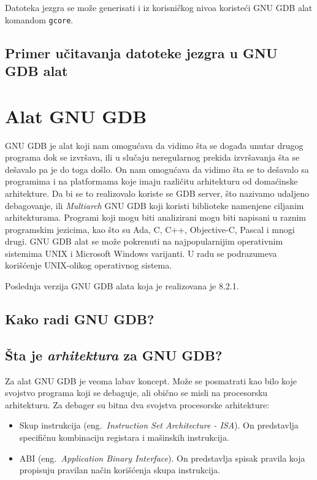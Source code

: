 \documentclass[12pt,oneside]{memoir}
\begin{document}
Datoteka jezgra se može generisati i iz korisničkog nivoa koristeći GNU GDB alat komandom \texttt{gcore}.

\section{Primer učitavanja datoteke jezgra u GNU GDB alat}

\chapter{Alat GNU GDB}
\label{chp:GDB}

GNU GDB je alat koji nam omogućava da vidimo šta se događa unutar drugog programa dok se izvršava, ili u slučaju neregularnog prekida izvršavanja šta se dešavalo pa je do toga došlo. On nam omogućava da vidimo šta se to dešavalo sa programima i na platformama koje imaju različitu arhitekturu od domaćinske arhitekture. Da bi se to realizovalo koriste se GDB server, što nazivamo udaljeno debagovanje, ili \emph{Multiarch} GNU GDB koji koristi biblioteke namenjene ciljanim arhitekturama. Programi koji mogu biti analizirani mogu biti napisani u raznim programskim jezicima, kao što su Ada, C, C++, Objective-C, Pascal i mnogi drugi. GNU GDB alat se može pokrenuti na najpopularnijim operativnim sistemima UNIX i Microsoft Windows varijanti. U radu se podrazumeva korišćenje UNIX-olikog operativnog sistema.

Poslednja verzija GNU GDB alata koja je realizovana je 8.2.1.

\section{Kako radi GNU GDB?}


\section{Šta je \emph{arhitektura} za GNU GDB?}

Za alat GNU GDB je veoma labav koncept. Može se posmatrati kao bilo koje svojstvo programa koji se debaguje, ali obično se misli na procesorsku arhitekturu. Za debager su bitna dva svojstva procesorske arhitekture:

\begin{itemize}
	\item Skup instrukcija (eng.~\emph{Instruction Set Architecture - ISA}). On predstavlja specifičnu kombinaciju registara i mašinskih instrukcija.
	\item ABI (eng.~\emph{Application Binary Interface}). On predstavlja spisak pravila koja propisuju pravilan način korišćenja skupa instrukcija.
\end{itemize}
\end{document}
